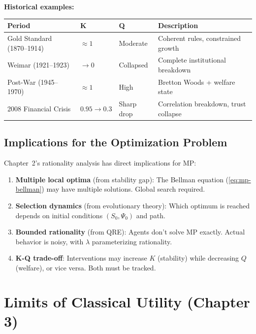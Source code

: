 \textbf{Historical examples:}
\begin{center}
\renewcommand{\arraystretch}{1.3}
\begin{tabular}{llll}
\toprule
\textbf{Period} & \textbf{K} & \textbf{Q} & \textbf{Description} \\
\midrule
Gold Standard (1870--1914) & $\approx 1$ & Moderate & Coherent rules, constrained growth \\
Weimar (1921--1923) & $\to 0$ & Collapsed & Complete institutional breakdown \\
Post-War (1945--1970) & $\approx 1$ & High & Bretton Woods + welfare state \\
2008 Financial Crisis & $0.95 \to 0.3$ & Sharp drop & Correlation breakdown, trust collapse \\
\bottomrule
\end{tabular}
\end{center}

\subsection{Implications for the Optimization Problem}

Chapter~2's rationality analysis has direct implications for MP:

\begin{enumerate}
\item \textbf{Multiple local optima} (from stability gap): The Bellman equation
      (\ref{eq:mp-bellman}) may have multiple solutions. Global search required.

\item \textbf{Selection dynamics} (from evolutionary theory): Which optimum is
      reached depends on initial conditions $(S_0, \Psi_0)$ and path.

\item \textbf{Bounded rationality} (from QRE): Agents don't solve MP exactly.
      Actual behavior is noisy, with $\lambda$ parameterizing rationality.

\item \textbf{K-Q trade-off}: Interventions may increase $K$ (stability) while
      decreasing $Q$ (welfare), or vice versa. Both must be tracked.
\end{enumerate}

\section{Limits of Classical Utility (Chapter 3)}
\label{sec:mp-limits}

